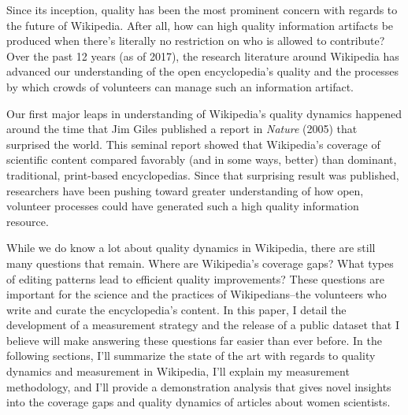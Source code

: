 Since its inception, quality has been the most prominent concern with regards to the future of Wikipedia. After all, how can high quality information artifacts be produced when there's literally no restriction on who is allowed to contribute? Over the past 12 years (as of 2017), the research literature around Wikipedia has advanced our understanding of the open encyclopedia's quality and the processes by which crowds of volunteers can manage such an information artifact.

Our first major leaps in understanding of Wikipedia's quality dynamics happened around the time that Jim Giles published a report in \emph{Nature} (2005)\cite{giles05internet} that surprised the world. This seminal report showed that Wikipedia's coverage of scientific content compared favorably (and in some ways, better) than dominant, traditional, print-based encyclopedias. Since that surprising result was published, researchers have been pushing toward greater understanding of how open, volunteer processes could have generated such a high quality information resource.

While we do know a lot about quality dynamics in Wikipedia, there are still many questions that remain. Where are Wikipedia's coverage gaps? What types of editing patterns lead to efficient quality improvements? These questions are important for the science and the practices of Wikipedians--the volunteers who write and curate the encyclopedia's content. In this paper, I detail the development of a measurement strategy and the release of a public dataset that I believe will make answering these questions far easier than ever before. In the following sections, I'll summarize the state of the art with regards to quality dynamics and measurement in Wikipedia, I'll explain my measurement methodology, and I'll provide a demonstration analysis that gives novel insights into the coverage gaps and quality dynamics of articles about women scientists.
